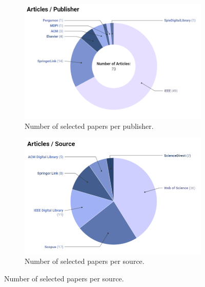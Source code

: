 \begin{figure}[H]    
    \caption{An Analysis of Paper Distribution Based on Source and Publisher.}
    \begin{subfigure}[b]{0.45\textwidth}
    \caption{Number of selected papers per publisher.}
        \includegraphics[width=\textwidth]{images/articles_per_publisher_2.png}
    \end{subfigure}
    \begin{subfigure}[b]{0.45\textwidth}
    \caption{Number of selected papers per source.}
        \includegraphics[width=\textwidth]{images/articles_per_source_pie.png}
    \end{subfigure}
    \label{fig:archive-itemtype}
\end{figure}
 

